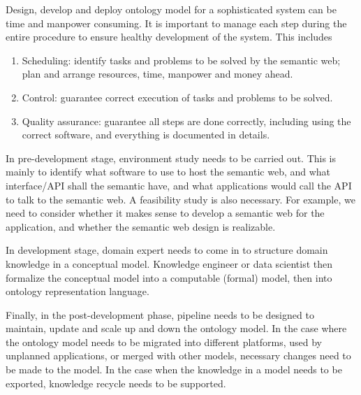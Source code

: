Design, develop and deploy ontology model for a sophisticated system can be time and manpower consuming. It is important to manage each step during the entire procedure to ensure healthy development of the system. This includes
\begin{enumerate}
	\item Scheduling: identify tasks and problems to be solved by the semantic web; plan and arrange resources, time, manpower and money ahead.
	\item Control: guarantee correct execution of tasks and problems to be solved.
	\item Quality assurance: guarantee all steps are done correctly, including using the correct software, and everything is documented in details.
\end{enumerate}

In pre-development stage, environment study needs to be carried out. This is mainly to identify what software to use to host the semantic web, and what interface/API shall the semantic have, and what applications would call the API to talk to the semantic web. A feasibility study is also necessary. For example, we need to consider whether it makes sense to develop a semantic web for the application, and whether the semantic web design is realizable.

In development stage, domain expert needs to come in to structure domain knowledge in a conceptual model. Knowledge engineer or data scientist then formalize the conceptual model into a computable (formal) model, then into ontology representation language.

Finally, in the post-development phase, pipeline needs to be designed to maintain, update and scale up and down the ontology model. In the case where the ontology model needs to be migrated into different platforms, used by unplanned applications, or merged with other models, necessary changes need to be made to the model. In the case when the knowledge in a model needs to be exported, knowledge recycle needs to be supported. 

